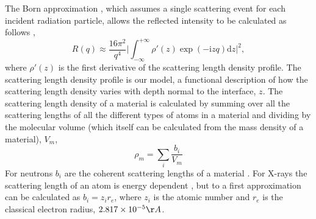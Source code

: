 \documentclass[
 reprint,
 superscriptaddress,
 amsmath,amssymb,
 aps,
]{revtex4-1}
\begin{document}
The Born approximation \cite{born_quantenmechanik_1926}, which assumes a single scattering event for each incident radiation particle, allows the reflected intensity to be calculated as follows \cite{sivia_elementary_2011},
%
\begin{equation}
    R(q) \approx \frac{16\pi^2}{q^4} \bigg| \int^{+\infty}_{-\infty}{\rho'(z)\exp{(-\mathrm{i} zq) \text{d}z} \bigg|^2},
    \label{equ:kine}
\end{equation}
%
where $\rho'(z)$ is the first derivative of the scattering length density profile.
The scattering length density profile is our model, a functional description of how the scattering length density varies with depth normal to the interface, $z$.
 The scattering length density of a material is calculated by summing over all the scattering lengths of all the different types of atoms in a material and dividing by the molecular volume (which itself can be calculated from the mass density of a material), $V_m$,
\begin{equation}
    \rho_m = \sum_{i} \frac{b_i}{V_m}
    \label{equ:sld}
\end{equation}
 For neutrons $b_i$ are the coherent scattering lengths of a material \cite{sears1992, dianoux2003neutron}. For X-rays the scattering length of an atom is energy dependent \cite{xray_form_factor}, but to a first approximation can be calculated as $b_i = z_i  r_e$, where $z_i$ is the atomic number and $r_e$ is the classical electron radius, $2.817 \times 10^{-5} \AA$.
 
\end{document}
